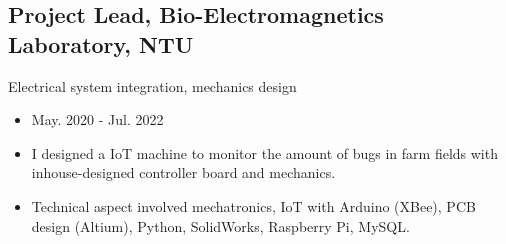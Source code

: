 \documentclass[12pt]{article}
\begin{document}
        \subsection*{Project Lead, Bio-Electromagnetics Laboratory, NTU}
        {\sffamily
        Electrical system integration, mechanics design
        \begin{itemize}
            \item May. 2020 - Jul. 2022
            \item I designed a IoT machine to monitor the amount of bugs in farm fields with inhouse-designed controller board and mechanics.
            \item Technical aspect involved mechatronics, IoT with Arduino (XBee), PCB design (Altium), Python, SolidWorks, Raspberry Pi, MySQL.
        \end{itemize}
        }
\end{document}
